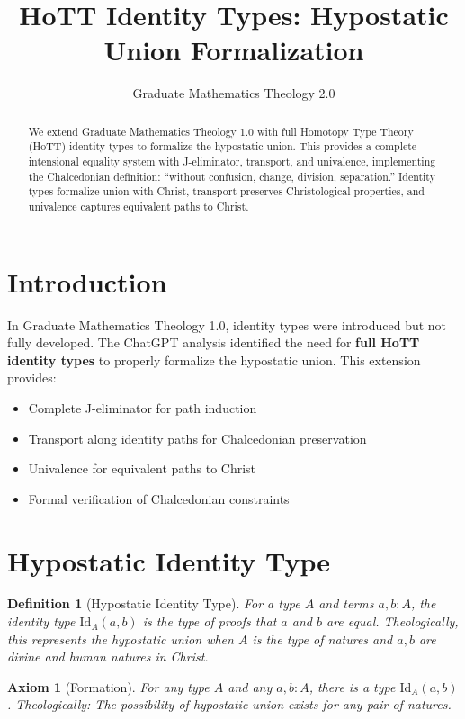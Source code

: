 \documentclass{article}
\title{HoTT Identity Types: Hypostatic Union Formalization}
\author{Graduate Mathematics Theology 2.0}
\date{}
\newtheorem{definition}{Definition}
\newtheorem{axiom}{Axiom}
\begin{document}
\maketitle

\begin{abstract}
We extend Graduate Mathematics Theology 1.0 with full Homotopy Type Theory (HoTT) identity types to formalize the hypostatic union. This provides a complete intensional equality system with J-eliminator, transport, and univalence, implementing the Chalcedonian definition: ``without confusion, change, division, separation.'' Identity types formalize union with Christ, transport preserves Christological properties, and univalence captures equivalent paths to Christ.
\end{abstract}

\section{Introduction}

In Graduate Mathematics Theology 1.0, identity types were introduced but not fully developed. The ChatGPT analysis identified the need for \textbf{full HoTT identity types} to properly formalize the hypostatic union. This extension provides:

\begin{itemize}
    \item Complete J-eliminator for path induction
    \item Transport along identity paths for Chalcedonian preservation
    \item Univalence for equivalent paths to Christ
    \item Formal verification of Chalcedonian constraints
\end{itemize}

\section{Hypostatic Identity Type}

\begin{definition}[Hypostatic Identity Type]
For a type $A$ and terms $a, b : A$, the identity type $\mathrm{Id}_A(a, b)$ is the type of proofs that $a$ and $b$ are equal. Theologically, this represents the hypostatic union when $A$ is the type of natures and $a, b$ are divine and human natures in Christ.
\end{definition}

\begin{axiom}[Formation]
For any type $A$ and any $a, b : A$, there is a type $\mathrm{Id}_A(a, b)$. Theologically: The possibility of hypostatic union exists for any pair of natures.
\end{axiom}
\end{document}
